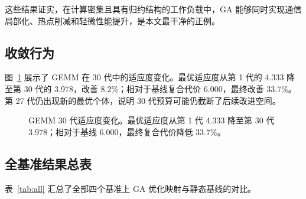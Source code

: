 \documentclass[conference]{IEEEtran}
\begin{document}
这些结果证实，在计算密集且具有归约结构的工作负载中，GA 能够同时实现通信局部化、热点削减和轻微性能提升，是本文最干净的正例。

\subsection{收敛行为}

图~\ref{fig:convergence} 展示了 GEMM 在 30 代中的适应度变化。最优适应度从第 1 代的 4.333 降至第 30 代的 3.978，改善 8.2\%；相对于基线复合代价 6.000，最终改善 33.7\%。第 27 代仍出现新的最优个体，说明 30 代预算可能仍截断了后续改进空间。

\begin{figure}[t]
\centering
\caption{GEMM 30 代适应度变化。最优适应度从第 1 代 4.333 降至第 30 代 3.978；相对于基线 6.000，最终复合代价降低 33.7\%。}
\label{fig:convergence}
\end{figure}

\subsection{全基准结果总表}

表~\ref{tab:all} 汇总了全部四个基准上 GA 优化映射与静态基线的对比。
\end{document}
